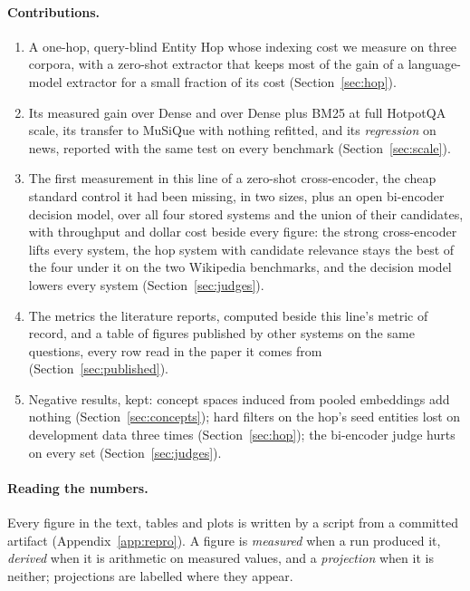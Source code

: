 \paragraph{Contributions.}
\begin{enumerate}
  \item A one-hop, query-blind Entity Hop whose indexing cost we measure on three corpora,
        with a zero-shot extractor that keeps most of the gain of a language-model extractor
        for a small fraction of its cost (Section~\ref{sec:hop}).
  \item Its measured gain over Dense and over Dense plus BM25 at full HotpotQA scale, its
        transfer to MuSiQue with nothing refitted, and its \emph{regression} on news, reported
        with the same test on every benchmark (Section~\ref{sec:scale}).
  \item The first measurement in this line of a zero-shot cross-encoder, the cheap standard
        control it had been missing, in two sizes, plus an open bi-encoder decision model,
        over all four stored systems and the union of their candidates, with throughput and
        dollar cost beside every figure: the strong cross-encoder lifts every system, the
        hop system with candidate relevance stays the best of the four under it on the two
        Wikipedia benchmarks, and the decision model lowers every system
        (Section~\ref{sec:judges}).
  \item The metrics the literature reports, computed beside this line's metric of record, and a
        table of figures published by other systems on the same questions, every row read in
        the paper it comes from (Section~\ref{sec:published}).
  \item Negative results, kept: concept spaces induced from pooled embeddings add nothing
        (Section~\ref{sec:concepts}); hard filters on the hop's seed entities lost on
        development data three times (Section~\ref{sec:hop}); the bi-encoder judge hurts on
        every set (Section~\ref{sec:judges}).
\end{enumerate}

\paragraph{Reading the numbers.} Every figure in the text, tables and plots is written by a
script from a committed artifact (Appendix~\ref{app:repro}). A figure is \emph{measured} when a
run produced it, \emph{derived} when it is arithmetic on measured values, and a
\emph{projection} when it is neither; projections are labelled where they appear.

